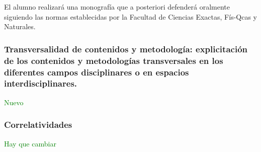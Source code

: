 \documentclass[a4paper, 12pt]{article}
\begin{document}
El alumno realizará una monografía que a posteriori defenderá
oralmente siguiendo las normas establecidas por la Facultad de Ciencias Exactas, Fís-Qcas y Naturales.



\subsubsection{Transversalidad de contenidos y metodología: explicitación de los contenidos y metodologías transversales en los diferentes campos disciplinares o en espacios interdisciplinares.} \textcolor{green}{Nuevo}

\subsubsection{Correlatividades}
 \textcolor{green}{Hay que cambiar}
\fontsize{9pt}{9pt}\selectfont
\end{document}

